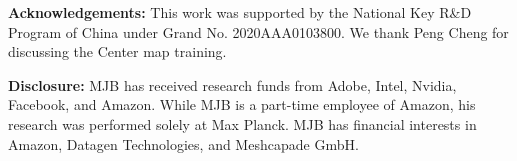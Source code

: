 \documentclass[10pt,twocolumn,letterpaper]{article}
\begin{document}
\noindent \textbf{Acknowledgements:} This work was supported by the National Key R\&D Program of China under Grand No. 2020AAA0103800. 
We thank Peng Cheng for discussing the Center map training.


\noindent 
\noindent\textbf{Disclosure:} MJB has received research funds
from Adobe, Intel, Nvidia, Facebook, and Amazon. While MJB
is a part-time employee of Amazon, his research was performed
solely at Max Planck. MJB has financial interests in Amazon, Datagen Technologies, and Meshcapade
GmbH.

{\small


}

\clearpage







\end{document}
